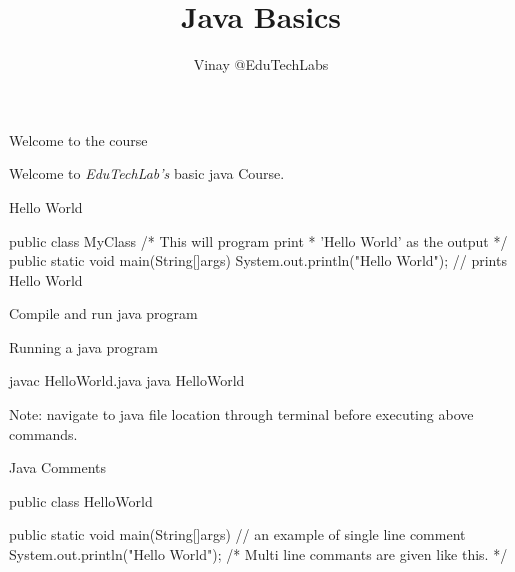 \documentclass[11pt]{beamer}
\author{Vinay @EduTechLabs}
\title{Java Basics}
\begin{document}
\frame{\maketitle}
\begin{frame}{Welcome to the course}
	\begin{center}
	 Welcome to \emph{\color{pblue}EduTechLab's} basic java Course.
	\end{center}
\end{frame}


\pycode{%
\begin{java}

\end{java}
}



\begin{frame}[containsverbatim]{Hello World}
\begin{java}
public class MyClass{
/* This will program print 
 * 'Hello World' as the output
 */
	public static void main(String[]args){
		System.out.println("Hello World"); 
		// prints Hello World
	}
}
\end{java}
\end{frame}

\begin{frame}[containsverbatim]{Compile and run java program}
	\begin{flushleft}
	
	
		\item{Running a java program} \\
		\begin{java}
		javac HelloWorld.java
		java HelloWorld
		\end{java}
		\item{Note: navigate to java file location through terminal before executing above commands.}
	\end{flushleft}
	
\end{frame}

\begin{frame}[containsverbatim]{Java Comments}
\begin{java}
public class HelloWorld{

public static void main(String[]args){
  // an example of single line comment
  System.out.println("Hello World");
  /* Multi line commants 
   are given like this. */
  }
}
\end{java}
\end{frame}
\end{document}

